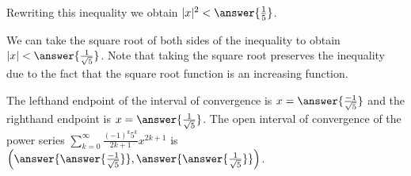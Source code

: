\documentclass{ximera}
\begin{document}
\begin{exercise}
\begin{exercise}
\begin{hint}
Rewriting this inequality we obtain $|x|^2< \answer{\frac{1}{5}}$. 

We can take the square root of both sides of the inequality to obtain $|x|<\answer{\frac{1}{\sqrt{5}}}$. Note that taking the square root preserves the inequality due to the fact that the square root function is an increasing function.

\end{hint}

\begin{exercise}

The lefthand endpoint of the interval of convergence is $x=\answer{\frac{-1}{\sqrt{5}}}$ and the righthand endpoint is $x= \answer{\frac{1}{\sqrt{5}}}$.  The open interval of convergence of the power series $\sum_{k=0}^{\infty} \frac{(-1)^k 5^k }{2k+1}x^{2k+1}$ is $\left(\answer{ \answer{\frac{-1}{\sqrt{5}}} },\answer{ \answer{\frac{1}{\sqrt{5}}} }\right)$.

\end{exercise}
\end{exercise}
\end{exercise}
\end{document}
